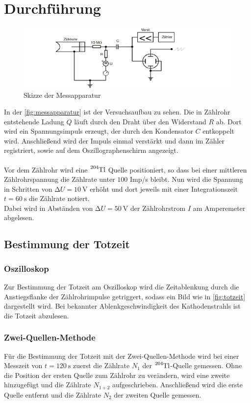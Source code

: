 \section{Durchführung}
\label{sec:Durchführung}
\begin{figure}
    \centering
    \includegraphics[width=\textwidth]{content/messapparatur.pdf}
    \caption{Skizze der Messapparatur \cite{anleitung}}
    \label{fig:messapparatur}
\end{figure}

In der \autoref{fig:messapparatur} ist der Versuchsaufbau zu sehen.
Die in Zählrohr entstehende Ladung $Q$ läuft durch den Draht über den Widerstand $R$ ab.
Dort wird ein Spannungsimpuls erzeugt, der durch den Kondensator $C$ entkoppelt wird.
Anschließend wird der Impuls einmal verstärkt und dann im Zähler registriert, sowie auf dem Oszillographenschirm angezeigt.\\
\\
Vor dem Zählrohr wird eine $\ce{^{204}Tl}$ Quelle positioniert, so dass bei einer mittleren Zählrohrspannung die Zählrate unter  $\num{100}$ Imp/s bleibt.
Nun wird die Spannung in Schritten von $\increment U = \SI{10}{\volt}$ erhöht und dort jeweils mit einer Integrationszeit $t=\SI{60}{\second}$ die Zählrate notiert.\\
Dabei wird in Abständen von $\increment U = \SI{50}{\volt}$ der Zählrohrstrom $I$ am Amperemeter abgelesen.\\

\subsection{Bestimmung der Totzeit}
\subsubsection{Oszilloskop}
Zur Bestimmung der Totzeit am Oszilloskop wird die Zeitablenkung durch die Anstiegsflanke der Zählrohrimpulse getriggert, sodass ein Bild wie in \autoref{fig:totzeit} dargestellt wird.
Bei bekannter Ablenkgeschwindigkeit des Kathodenstrahls ist die Totzeit abzulesen. \\
\subsubsection{Zwei-Quellen-Methode}
Für die Bestimmung der Totzeit mit der Zwei-Quellen-Methode wird bei einer Messzeit von $t=\SI{120}{\second}$ zuerst die Zählrate $N_1$ der $\ce{^{204}Tl}$-Quelle gemessen.
Ohne die Position der ersten Quelle zum Zählrohr zu verändern, wird eine zweite hinzugefügt und die Zählrate $N_{1+2}$ aufgeschrieben.
Anschließend wird die erste Quelle entfernt und die Zählrate $N_2$ der zweiten Quelle gemessen.\\

